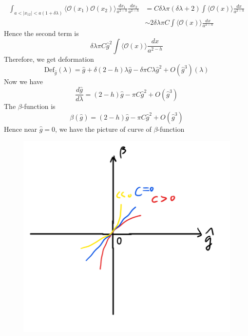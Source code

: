 \begin{equation}
	\begin{split}
	\int_{a < |x_{12} | < a(1+\delta\lambda)} \langle \mathcal{O}(x_1) \mathcal{O}(x_2) \rangle \frac{d x_1}{a^{2-h}} \frac{d x_2}{a^{2-h}} & = C \delta \lambda \pi (\delta\lambda +2) \int \langle \mathcal{O}(x)\rangle \frac{dx}{a^{2-h}}\\
	& \sim 2 \delta \lambda \pi C \int \langle \mathcal{O}(x) \rangle \frac{dx}{a^{2-h}}
	\end{split}
\end{equation}
Hence the second term is 
\[
\delta \lambda \pi C \hat{g}^2  \int \langle \mathcal{O}(x) \rangle \frac{dx}{a^{2-h}}
\]
Therefore, we get deformation
\begin{equation}
	\text{Def}_{\hat{g}}(\lambda) = \hat{g} + \delta(2-h) \lambda \hat{g} - \delta \pi C \lambda \hat{g}^2 + O(\hat{g}^3)(\lambda)
\end{equation}
Now we have 
\begin{equation}
	\frac{d \hat{g}}{d\lambda} = (2-h) \hat{g} - \pi C \hat{g}^2 + O(\hat{g}^3)
\end{equation}
The $\beta$-function is 
\[
\beta(\hat{g}) = (2-h) \hat{g} - \pi C \hat{g}^2 + O(\hat{g}^3)
\]
Hence near $\hat{g}=0$, we have the picture of curve of $\beta$-function
\begin{figure}[h]
	\centering\includegraphics[scale=0.5]{PIC/hw8pic1.png}
\end{figure}
